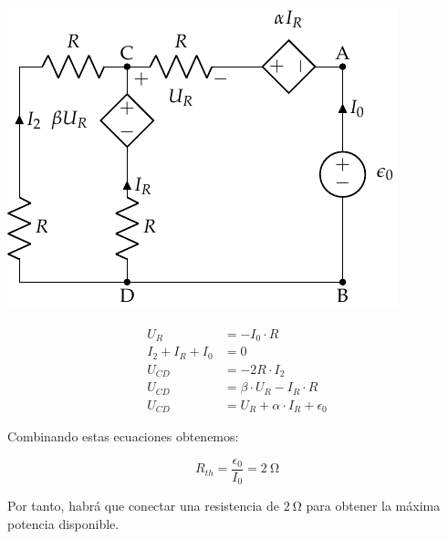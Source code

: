 \begin{minipage}{0.5\linewidth}
  \includegraphics[width=.9\linewidth]{figuras/norton_fuenteprueba.pdf}
\end{minipage}
\begin{minipage}{0.5\linewidth}
  \begin{align*}
    U_R &= -I_0 \cdot R\\
    I_2 + I_R + I_0 &= 0\\
    U_{CD} &= -2R\cdot I_2\\
    U_{CD} &= \beta \cdot U_R - I_R \cdot R\\
    U_{CD} &= U_R + \alpha \cdot I_R + \epsilon_0
  \end{align*}
\end{minipage}

Combinando estas ecuaciones obtenemos:

\begin{equation*}
  R_{th} = \frac{\epsilon_0}{I_0} = \qty{2}{\ohm}
\end{equation*}

Por tanto, habrá que conectar una resistencia de $\qty{2}{\ohm}$ para obtener la máxima potencia disponible.



